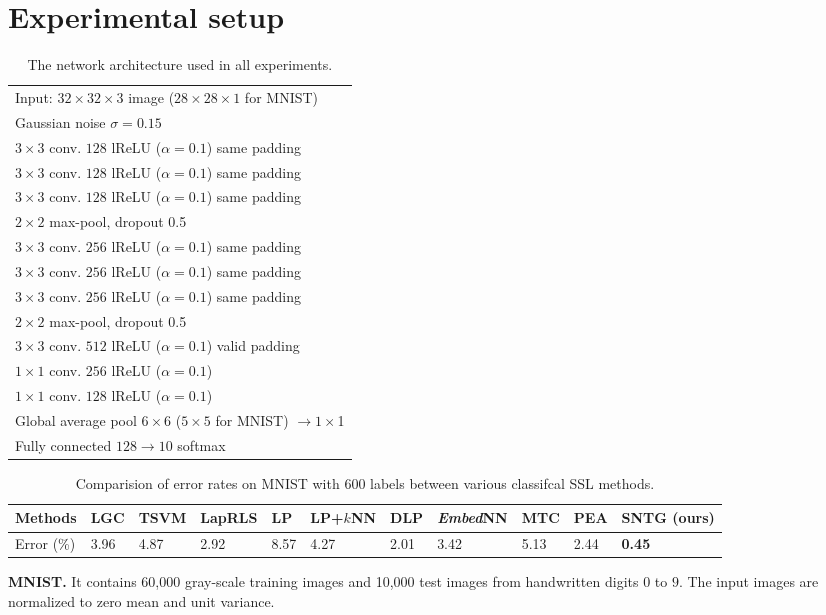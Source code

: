 \documentclass[10pt,twocolumn,letterpaper]{article}
\begin{document}
\clearpage

{\small
	
	
}



\clearpage
\appendix	
\section{Experimental setup}
\label{app:1}
\begin{table}
	\centering
	\caption{\label{table:network}
		The network architecture used in all experiments.}
	\begin{tabular}{l}
		\toprule
		Input: $32\times32\times3$ image ($28\times28\times1$ for MNIST)\\
		Gaussian noise $\sigma=0.15$ \\
		$3\times3$ conv. $128$ lReLU ($\alpha=0.1$) same padding\\
		$3\times3$ conv. $128$ lReLU ($\alpha=0.1$) same padding\\
		$3\times3$ conv. $128$ lReLU ($\alpha=0.1$) same padding\\
		$2\times2$ max-pool, dropout 0.5 \\
		$3\times3$ conv. $256$ lReLU ($\alpha=0.1$) same padding\\
		$3\times3$ conv. $256$ lReLU ($\alpha=0.1$) same padding\\
		$3\times3$ conv. $256$ lReLU ($\alpha=0.1$) same padding\\
		$2\times2$ max-pool, dropout 0.5 \\
		$3\times3$ conv. $512$ lReLU ($\alpha=0.1$) valid padding\\
		$1\times1$ conv. $256$ lReLU ($\alpha=0.1$) \\
		$1\times1$ conv. $128$ lReLU ($\alpha=0.1$) \\
		Global average pool $6\times6$ ($5\times5$ for MNIST) $\to 1\times$1\\
		Fully connected $128 \to 10$ softmax\\
		\bottomrule
	\end{tabular}
\end{table}

\begin{table*}[t]
	\caption{Comparision of error rates on MNIST with 600 labels between various classifcal SSL methods.}
	\label{classical}
	\centering
	\begin{tabular}{lllllllllll}
		\toprule
		Methods 	&LGC	&TSVM&LapRLS&LP&LP+$k$NN&DLP& \emph{Embed}NN & MTC &PEA&SNTG (\textbf{ours})\\
		\midrule
		Error (\%) 	&3.96	&4.87		&2.92		&8.57 & 4.27& 2.01&3.42&5.13&2.44&\textbf{0.45}\\
		\bottomrule
	\end{tabular}
\end{table*}
\textbf{MNIST.}
It contains 60,000 gray-scale training images and 10,000 test images from handwritten digits $0$ to $9$. The input images are normalized to zero mean and unit variance.
\end{document}
